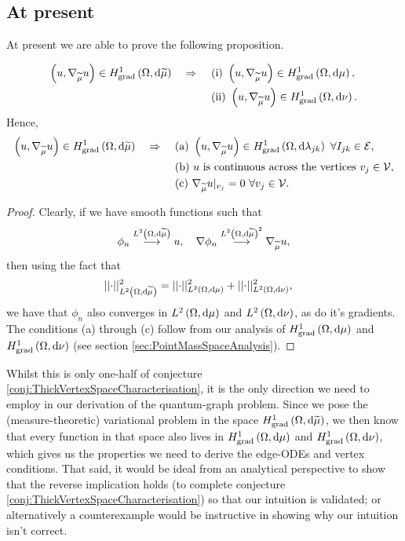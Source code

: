 \documentclass[11pt]{report}
\begin{document}
\subsection{At present}
At present we are able to prove the following proposition.
\begin{prop}
	\begin{align*}
		\left( u, \nabla_{\widetilde{\mu}}u \right)\in H^1_\mathrm{grad}\left( \Omega, \mathrm{d}\widetilde{\mu} \right) \quad\Rightarrow\quad
		& \ \text{(i)} \ \left( u, \nabla_{\widetilde{\mu}}u \right)\in H^1_\mathrm{grad}\left( \Omega, \mathrm{d}\mu \right), \\
		& \ \text{(ii)} \ \left( u, \nabla_{\widetilde{\mu}}u \right)\in H^1_\mathrm{grad}\left( \Omega, \mathrm{d}\nu \right). \\
	\end{align*}
	Hence,
	\begin{align*}
		\left( u, \nabla_{\widetilde{\mu}}u \right)\in H^1_\mathrm{grad}\left( \Omega, \mathrm{d}\widetilde{\mu} \right) \quad\Rightarrow\quad
		& \ \text{(a)} \ \left( u, \nabla_{\widetilde{\mu}}u \right)\in H^1_\mathrm{grad}\left( \Omega, \mathrm{d}\lambda_{jk} \right) \ \forall I_{jk}\in\mathcal{E}, \\
		& \ \text{(b)} \ u \text{ is continuous across the vertices} \ v_j\in\mathcal{V}, \\
		& \ \text{(c)} \ \nabla_{\widetilde{\mu}}u\vert_{v_j} = 0 \ \forall v_j\in\mathcal{V}.
	\end{align*}
\end{prop}
\begin{proof}
	Clearly, if we have smooth functions such that
	\begin{align*}
		\phi_n \overset{L^{2}\left( \Omega,\mathrm{d}\widetilde{\mu} \right)}{\longrightarrow} u, \quad \nabla\phi_n\overset{L^{2}\left( \Omega,\mathrm{d}\widetilde{\mu} \right)^2}{\longrightarrow}\nabla_{\widetilde{\mu}}u,
	\end{align*}
	then using the fact that
	\begin{align*}
		\lvert\lvert \cdot \rvert\rvert_{L^{2}\left( \Omega,\mathrm{d}\widetilde{\mu} \right)}^2 &= \lvert\lvert \cdot \rvert\rvert_{L^{2}\left( \Omega,\mathrm{d}\mu \right)}^2 + \lvert\lvert \cdot \rvert\rvert_{L^{2}\left( \Omega,\mathrm{d}\nu \right)}^2,
	\end{align*}
	we have that $\phi_n$ also converges in $L^{2}\left( \Omega,\mathrm{d}\mu \right)$ and $L^{2}\left( \Omega,\mathrm{d}\nu \right)$, as do it's gradients.	
	The conditions (a) through (c) follow from our analysis of $H^1_\mathrm{grad}\left( \Omega, \mathrm{d}\mu \right)$ and $H^1_\mathrm{grad}\left( \Omega, \mathrm{d}\nu \right)$ (see section \ref{sec:PointMassSpaceAnalysis}).
\end{proof}
Whilst this is only one-half of conjecture \ref{conj:ThickVertexSpaceCharacterisation}, it is the only direction we need to employ in our derivation of the quantum-graph problem.
Since we pose the (measure-theoretic) variational problem in the space $H^1_\mathrm{grad}\left( \Omega, \mathrm{d}\widetilde{\mu} \right)$, we then know that every function in that space also lives in $H^1_\mathrm{grad}\left( \Omega, \mathrm{d}\mu \right)$ and $H^1_\mathrm{grad}\left( \Omega, \mathrm{d}\nu \right)$, which gives us the properties we need to derive the edge-ODEs and vertex conditions.
That said, it would be ideal from an analytical perspective to show that the reverse implication holds (to complete conjecture \ref{conj:ThickVertexSpaceCharacterisation}) so that our intuition is validated; or alternatively a counterexample would be instructive in showing why our intuition isn't correct.
\end{document}
